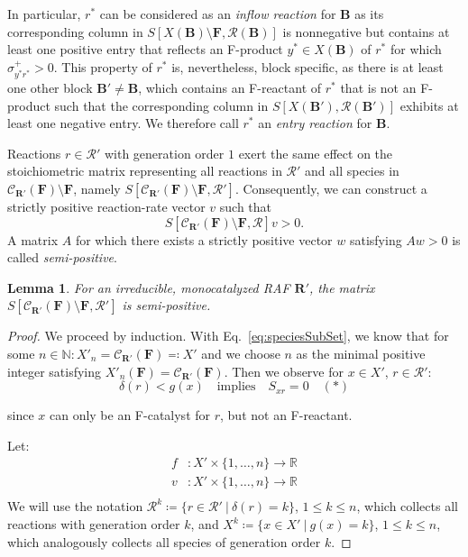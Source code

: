 \documentclass[pdflatex]{sn-jnl}
\theoremstyle{thmstyleone}%
\newtheorem{lemma}[theorem]{Lemma}%
\theoremstyle{examplesty}%
\theoremstyle{thmstylethree}%
\newcommand{\food}{\ensuremath{\mathbf{F}}}
\newcommand{\SM}{S}
\newcommand{\closure}[2]{\mathscr{C}_{#1}(#2)}
\newcommand{\CR}[0]{\mathcal{R}}
\newcommand{\RAF}[0]{\mathbf{R}'}
\newcommand{\block}[0]{\mathbf{B}}
\newcommand{\sgen}{g}
\newcommand{\crgen}{\delta}
\begin{document}
{In particular, $r^*$ can be considered as an \emph{inflow reaction} for $\block$ as its corresponding column in $\SM[X(\block)\setminus \food,\CR(\block)]$ is nonnegative but contains at least one positive entry that reflects an F-product $y^* \in X(\block)$ of $r^*$ for which $\sigma^+_{y^*r^*}>0$. This property of $r^*$ is, nevertheless, block specific, as there is at least one other block $\block'\neq \block$, which contains an F-reactant of $r^*$ that is not an F-product such that the corresponding column in $\SM[X(\block'),\CR(\block')]$ exhibits at least one negative entry. We therefore call $r^*$ an \emph{entry reaction} for $\block$.

Reactions $r\in \CR'$ with generation order $1$ exert the same effect on the stoichiometric matrix representing all reactions in $\CR'$ and all species in $\closure{\RAF}{\food}\setminus \food$, namely $\SM[\closure{\RAF}{\food}\setminus \food, \CR']$. Consequently, we can construct a strictly positive reaction-rate vector $v$ such that 
\begin{equation}
	\SM[\closure{\RAF}{\food}\setminus \food, \CR]v>0.
\end{equation}
A matrix $A$ for which there exists a strictly positive vector $w$ satisfying $Aw>0$ is called \emph{semi-positive}.

\vspace{6pt}
\begin{lemma}\label{lem:NonFoodSemipositiv}
  For an irreducible, monocatalyzed RAF $\RAF$, the matrix 
  $\SM[\closure{\RAF}{\food}\setminus \food, \CR']$ is semi-positive.
\end{lemma}
\begin{proof}
  We proceed by induction. With Eq.~\eqref{eq:speciesSubSet}, we know that for some $n\in \mathbb{N}: X'_n=\closure{\RAF}{\food}\eqqcolon X'$ and we choose $n$ as the minimal positive integer satisfying $X'_n(\food)=\closure{\RAF}{\food}$. Then we observe for
    $x\in X'$, $r\in \CR'$:
    \begin{equation}
	\crgen(r)<\sgen(x) \quad \text{implies} \quad \SM_{xr}=0 \quad (*)
    \end{equation}
    
  since $x$ can only be an F-catalyst for $r$, but not an F-reactant.
  
Let: 
\begin{equation}
	\begin{split}
  		f&: X'\times \{1, \ldots, n\} \rightarrow \mathbb{R} \\[0.5em]
		v&: X'\times \{1,\ldots, n\} \rightarrow \mathbb{R} \\[0.5em]
	\end{split}
\end{equation}
We will use the notation $\CR^k\coloneqq \{r\in \CR' \ \vert \ 
\crgen(r)=k\}$, $1\leq k\leq n$, which collects all reactions with 
generation order $k$, and $X^k\coloneqq \{x\in X' \ \vert \ \sgen(x)=k\}$, 
$1\leq k \leq n$, which analogously collects all species of generation 
order $k$.
	

\end{proof}}
\end{document}
